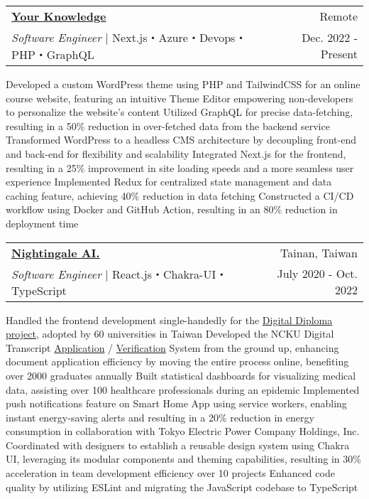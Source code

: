 \newcommand{\resumeExpEntry}[5]{
  \vspace{5pt}\item
    \begin{tabular*}{0.97\textwidth}{l@{\extracolsep{\fill}}r}
      \textbf{#1} & \small #2 \\
      \textit{#3} | #4 & \small #5 \\
    \end{tabular*}\vspace{-5pt}
}

\resumeExpEntry
{\href{https://yourknowledge.online}{Your Knowledge}}
{Remote}
{Software Engineer}
{Next.js・Azure・Devops・PHP・GraphQL}
{Dec. 2022 - Present}
{
  \resumeItemListStart
    \resumeItem
    {Developed a custom WordPress theme using PHP and TailwindCSS for an online course website, featuring an intuitive Theme Editor empowering non-developers to personalize the website's content}
    \resumeItem
    {Utilized GraphQL for precise data-fetching, resulting in a 50\% reduction in over-fetched data from the backend service}
    \resumeItem
    {Transformed WordPress to a headless CMS architecture by decoupling front-end and back-end for flexibility and scalability}
    \resumeItem
    {Integrated Next.js for the frontend, resulting in a 25\% improvement in site loading speeds and a more seamless user experience}
    \resumeItem
    {Implemented Redux for centralized state management and data caching feature, achieving 40\% reduction in data fetching}
    \resumeItem
    {Constructed a CI/CD workflow using Docker and GitHub Action, resulting in an 80\% reduction in deployment time}
  \resumeItemListEnd
}

\resumeExpEntry
{\href{https://19gale.ai}{Nightingale AI.}}
{Tainan, Taiwan}
{Software Engineer}
{React.js・Chakra-UI・TypeScript}
{July 2020 - Oct. 2022}
{
  \resumeItemListStart
    \resumeItem
    {Handled the frontend development single-handedly for the \href{https://dcert.moe.gov.tw}{Digital Diploma project}, adopted by 60 universities in Taiwan}
    \resumeItem
    {Developed the NCKU Digital Transcript \href{https://stuapply.diploma.ncku.edu.tw/release}{Application} / \href{https://stuapply.diploma.ncku.edu.tw/verify}{Verification} System from the ground up, enhancing document application efficiency by moving the entire process online, benefiting over 2000 graduates annually}
    \resumeItem
    {Built statistical dashboards for visualizing medical data, assisting over 100 healthcare professionals during an epidemic}
    \resumeItem
    {Implemented push notifications feature on Smart Home App using service workers, enabling instant energy-saving alerts and resulting in a 20\% reduction in energy consumption in collaboration with Tokyo Electric Power Company Holdings, Inc.}
    \resumeItem
    {Coordinated with designers to establish a reusable design system using Chakra UI, leveraging its modular components and theming capabilities, resulting in 30\% acceleration in team development efficiency over 10 projects}
    \resumeItem
    {Enhanced code quality by utilizing ESLint and migrating the JavaScript codebase to TypeScript}
  \resumeItemListEnd
}

